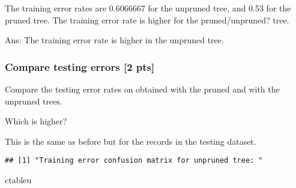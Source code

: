 \documentclass[
]{article}
\newenvironment{Shaded}{\begin{snugshade}}{\end{snugshade}}
\newcommand{\AttributeTok}[1]{\textcolor[rgb]{0.77,0.63,0.00}{#1}}
\newcommand{\DecValTok}[1]{\textcolor[rgb]{0.00,0.00,0.81}{#1}}
\newcommand{\FunctionTok}[1]{\textcolor[rgb]{0.00,0.00,0.00}{#1}}
\newcommand{\NormalTok}[1]{#1}
\newcommand{\OtherTok}[1]{\textcolor[rgb]{0.56,0.35,0.01}{#1}}
\newcommand{\SpecialCharTok}[1]{\textcolor[rgb]{0.00,0.00,0.00}{#1}}
\newcommand{\StringTok}[1]{\textcolor[rgb]{0.31,0.60,0.02}{#1}}
\begin{document}
The training error rates are 0.6066667 for the unpruned tree, and 0.53
for the pruned tree. The training error rate is higher for the
pruned/unpruned? tree.

Ans: The training error rate is higher in the unpruned tree.

\hypertarget{compare-testing-errors-2-pts}{%
\subsubsection{Compare testing errors {[}2
pts{]}}\label{compare-testing-errors-2-pts}}

Compare the testing error rates on obtained with the pruned and with the
unpruned trees.

Which is higher?

This is the same as before but for the records in the testing dataset.

\begin{Shaded}
\end{Shaded}

\begin{verbatim}
## [1] "Training error confusion matrix for unpruned tree: "
\end{verbatim}

\begin{Shaded}
\begin{Highlighting}[]
\NormalTok{ctableu}
\end{Highlighting}
\end{Shaded}
\end{document}
